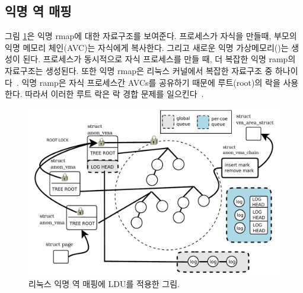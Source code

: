 \subsection{익명 역 매핑}


그림 \ref{fig:anonvmaramp}은 익명 rmap에 대한 자료구조를 보여준다.
프로세스가 자식을 만들때, 부모의 익명 메모리 체인(AVC)는 자식에게 복사한다. 
그리고 새로운 익명 가상메모리()는 생성이 된다.
프로세스가 동시적으로 자식 프로세스를 만들 때, 더 복잡한 익명 ramp의 자료구조는 생성된다.
또한 익명 rmap은 리눅스 커널에서 복잡한 자료구조 중 하나이다~\cite{CorbetLWNANON}.
익명 ramp은 자식 프로세스간 AVCs를 공유하기 때문에 루트(root)의 락을 사용한다.
따라서 이러한 루트 락은 락 경합 문제를 일으킨다~\cite{Andi2011adding}.  


\begin{figure}[tb]
  \begin{center}
     \includegraphics[width=1\textwidth,height=1\textheight,keepaspectratio]{fig/anon_vma}
  \end{center}
  \caption{리눅스 익명 역 매핑에 LDU를 적용한 그림.}
  \label{fig:anonvmaramp}
\end{figure}

